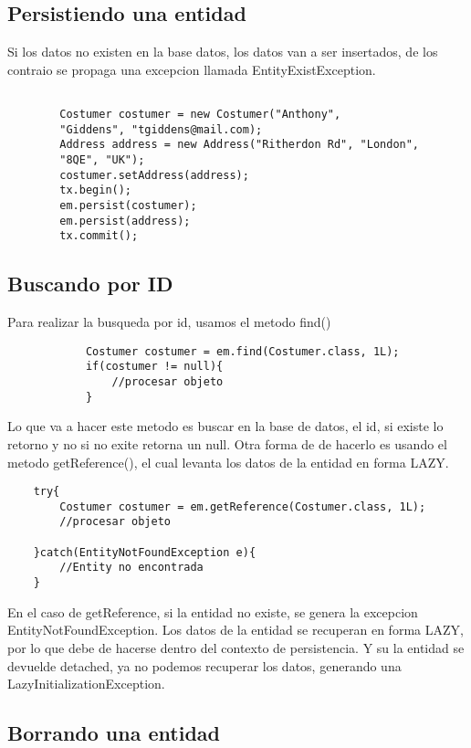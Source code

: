 \documentclass{article}
\begin{document}
\subsection*{Persistiendo una entidad}
Si los datos no existen en la base datos, los datos van a ser insertados, de los contraio se propaga
una excepcion llamada EntityExistException.
\begin{lstlisting}
        
        Costumer costumer = new Costumer("Anthony", 
        "Giddens", "tgiddens@mail.com);
        Address address = new Address("Ritherdon Rd", "London",
        "8QE", "UK");  
        costumer.setAddress(address);
        tx.begin();
        em.persist(costumer);
        em.persist(address);
        tx.commit();
    \end{lstlisting}
\subsection*{Buscando por ID}
Para realizar la busqueda por id, usamos el metodo find()
\begin{lstlisting}
            Costumer costumer = em.find(Costumer.class, 1L);
            if(costumer != null){
                //procesar objeto
            }
        \end{lstlisting}

Lo que va a hacer este metodo es buscar en la base de datos, el id, si existe lo retorno y no si no exite retorna un null.
Otra forma de de hacerlo es usando el metodo getReference(), el cual levanta los datos de la entidad en forma LAZY.

\begin{lstlisting}
    try{
        Costumer costumer = em.getReference(Costumer.class, 1L);
        //procesar objeto

    }catch(EntityNotFoundException e){
        //Entity no encontrada
    }
\end{lstlisting}

En el caso de getReference, si la entidad no existe, se genera la excepcion EntityNotFoundException. Los datos de la entidad se recuperan
en forma LAZY, por lo que debe de hacerse dentro del contexto de persistencia. Y su la entidad se devuelde detached, ya no podemos recuperar los datos,
generando una LazyInitializationException.

\subsection*{Borrando una entidad}
\end{document}
